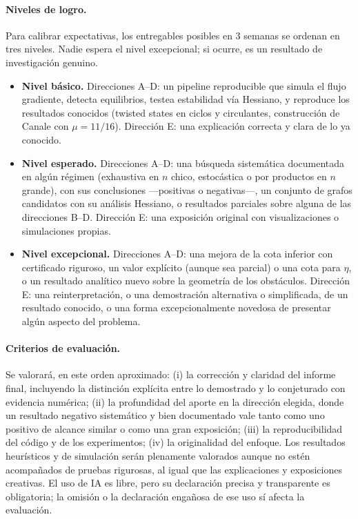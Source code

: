\documentclass[11pt,a4paper]{article}
\begin{document}
\paragraph{Niveles de logro.}
Para calibrar expectativas, los entregables posibles en 3 semanas se ordenan en tres niveles. Nadie espera el nivel excepcional; si ocurre, es un resultado de investigación genuino.
\begin{itemize}
    \item \textbf{Nivel básico.} Direcciones A--D: un pipeline reproducible que simula el flujo gradiente, detecta equilibrios, testea estabilidad vía Hessiano, y reproduce los resultados conocidos (twisted states en ciclos y circulantes, construcción de Canale con $\mu = 11/16$). Dirección E: una explicación correcta y clara de lo ya conocido.
    \item \textbf{Nivel esperado.} Direcciones A--D: una búsqueda sistemática documentada en algún régimen (exhaustiva en $n$ chico, estocástica o por productos en $n$ grande), con sus conclusiones —positivas o negativas—, un conjunto de grafos candidatos con su análisis Hessiano, o resultados parciales sobre alguna de las direcciones B--D. Dirección E: una exposición original con visualizaciones o simulaciones propias.
    \item \textbf{Nivel excepcional.} Direcciones A--D: una mejora de la cota inferior con certificado riguroso, un valor explícito (aunque sea parcial) o una cota para $\eta$, o un resultado analítico nuevo sobre la geometría de los obstáculos. Dirección E: una reinterpretación, o una demostración alternativa o simplificada, de un resultado conocido, o una forma excepcionalmente novedosa de presentar algún aspecto del problema.
\end{itemize}

\paragraph{Criterios de evaluación.}
Se valorará, en este orden aproximado: (i) la corrección y claridad del informe final, incluyendo la distinción explícita entre lo demostrado y lo conjeturado con evidencia numérica; (ii) la profundidad del aporte en la dirección elegida, donde un resultado negativo sistemático y bien documentado vale tanto como uno positivo de alcance similar o como una gran exposición; (iii) la reproducibilidad del código y de los experimentos; (iv) la originalidad del enfoque. Los resultados heurísticos y de simulación serán plenamente valorados aunque no estén acompañados de pruebas rigurosas, al igual que las explicaciones y exposiciones creativas. El uso de IA es libre, pero su declaración precisa y transparente es obligatoria; la omisión o la declaración engañosa de ese uso sí afecta la evaluación.
\end{document}
